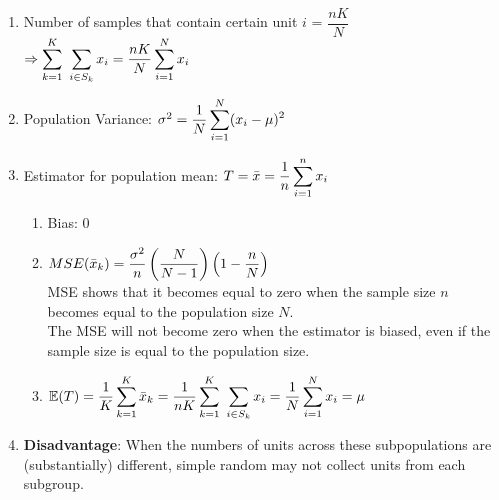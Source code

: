 \begin{enumerate}[itemsep=0.2cm]
    \item Number of samples that contain certain unit $i$ = $\dfrac{nK}{N}$ 
    \hfill \cite{statistics/book/Statistics-for-Data-Scientists/Maurits-Kaptein}
    \\
    $
        \Rightarrow
        \displaystyle\sum_{k=1}^{K}\ \displaystyle\sum_{i \in S_k} x_i
        = \dfrac{nK}{N}\displaystyle\sum_{i=1}^{N} x_i
    $
    \hfill \cite{statistics/book/Statistics-for-Data-Scientists/Maurits-Kaptein}

    \item Population Variance: $
        \sigma^2
        = \dfrac{1}{N} \displaystyle\sum_{i=1}^N (x_i-\mu)^2
    $
    \hfill \cite{statistics/book/Statistics-for-Data-Scientists/Maurits-Kaptein}

    \item Estimator for population mean: $
        T 
        = \bar{x}
        = \dfrac{1}{n} \displaystyle\sum_{i=1}^n x_i
    $
    \hfill \cite{statistics/book/Statistics-for-Data-Scientists/Maurits-Kaptein}
    \begin{enumerate}[itemsep=0.2cm]
        \item Bias: $0$
        \hfill \cite{statistics/book/Statistics-for-Data-Scientists/Maurits-Kaptein}

        \item $
            MSE(\bar{x}_k)
            = \dfrac{\sigma^2 }{n}
            \left(\dfrac{N}{N-1}\right)
            \left(1-\dfrac{n}{N}\right)
        $
        \hfill \cite{statistics/book/Statistics-for-Data-Scientists/Maurits-Kaptein}
        \\
        MSE shows that it becomes equal to zero when the sample size $n$ becomes equal to the population size $N$.
        \hfill \cite{statistics/book/Statistics-for-Data-Scientists/Maurits-Kaptein}
        \\
        The MSE will not become zero when the estimator is biased, even if the sample size is equal to the population size.
        \hfill \cite{statistics/book/Statistics-for-Data-Scientists/Maurits-Kaptein}
        

        \item $
            \mathbb{E}(T) 
            = \dfrac{1}{K}\displaystyle\sum_{k=1}^{K} \bar{x}_k
            = \dfrac{1}{nK}\displaystyle\sum_{k=1}^{K}\ \displaystyle\sum_{i \in S_k} x_i
            = \dfrac{1}{N}\displaystyle\sum_{i=1}^{N} x_i
            = \mu
        $
        \hfill \cite{statistics/book/Statistics-for-Data-Scientists/Maurits-Kaptein}
    \end{enumerate}

    \item \textbf{Disadvantage}: When the numbers of units across these subpopulations are (substantially) different, simple random may not collect units from each subgroup.
    \hfill \cite{statistics/book/Statistics-for-Data-Scientists/Maurits-Kaptein}
    
\end{enumerate}

